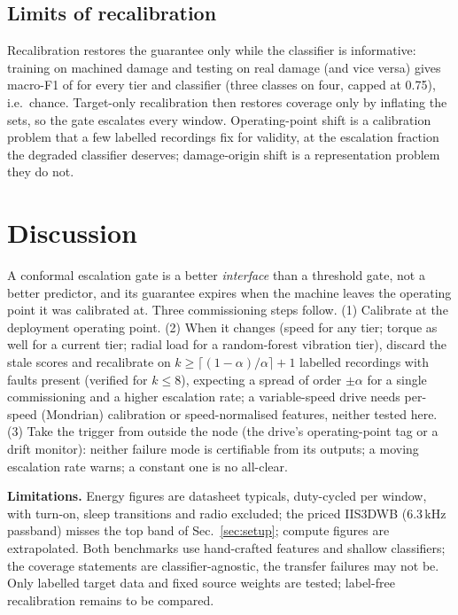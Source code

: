 \documentclass{ifacconf}
\begin{document}
\subsection{Limits of recalibration}
Recalibration restores the guarantee only while the classifier is informative: training on machined damage and testing on real damage (and vice versa) gives macro-F1 of \damageFone{} for every tier and classifier (three classes on four, capped at 0.75), i.e.\ chance. Target-only recalibration then restores coverage only by inflating the sets, so the gate escalates every window. Operating-point shift is a calibration problem that a few labelled recordings fix for validity, at the escalation fraction the degraded classifier deserves; damage-origin shift is a representation problem they do not.

\section{Discussion}

A conformal escalation gate is a better \emph{interface} than a threshold gate, not a better predictor, and its guarantee expires when the machine leaves the operating point it was calibrated at. Three commissioning steps follow. (1) Calibrate at the deployment operating point. (2) When it changes (speed for any tier; torque as well for a current tier; radial load for a random-forest vibration tier), discard the stale scores and recalibrate on $k\ge\lceil(1-\alpha)/\alpha\rceil+1$ labelled recordings with faults present (verified for $k\le8$), expecting a spread of order $\pm\alpha$ for a single commissioning and a higher escalation rate; a variable-speed drive needs per-speed (Mondrian) calibration or speed-normalised features, neither tested here. (3) Take the trigger from outside the node (the drive's operating-point tag or a drift monitor): neither failure mode is certifiable from its outputs; a moving escalation rate warns; a constant one is no all-clear.

\textbf{Limitations.} Energy figures are datasheet typicals, duty-cycled per window, with turn-on, sleep transitions and radio excluded; the priced IIS3DWB (6.3\,kHz passband) misses the top band of Sec.~\ref{sec:setup}; compute figures are extrapolated. Both benchmarks use hand-crafted features and shallow classifiers; the coverage statements are classifier-agnostic, the transfer failures may not be. Only labelled target data and fixed source weights are tested; label-free recalibration \citep{yilmaz2022testtime} remains to be compared.
\end{document}
